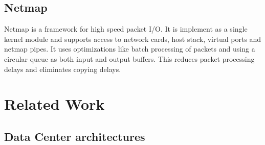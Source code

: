 \subsection{Netmap}
Netmap is a framework for high speed packet I/O. It is implement as a single kernel module and supports access to network cards, host stack, virtual ports and netmap pipes. 
It uses optimizations like batch processing of packets and using a circular queue as both input and output buffers. This reduces packet processing delays and eliminates copying delays.
\section{Related Work}

\subsection{Data Center architectures}

